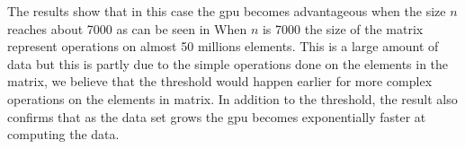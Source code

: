 The results show that in this case the \acrshort{gpu} becomes advantageous when the size  $n$ reaches about 7000 as can be seen in 
When $n$ is 7000 the size of the matrix represent operations on almost 50 millions elements.
This is a large amount of data but this is partly due to the simple operations done on the elements in the matrix, we believe that the threshold would happen earlier for more complex operations on the elements in matrix.
In addition to the threshold, the result also confirms that as the data set grows the \acrshort{gpu} becomes exponentially faster at computing the data. 

